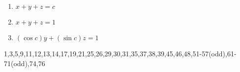 \noindent{\color{smalt(darkpowderblue)}\rule{\linewidth}{.2mm}}
\begin{example} 
\begin{enumerate}
    \item $x+y+z=c$
    \item $x+y+z=1$ 
    \item $(\cos{c})y+(\sin{c})z=1$
\end{enumerate} 
\end{example}
\noindent{\color{smalt(darkpowderblue)}\rule{\linewidth}{.2mm}}
\begin{problem}
1,3,5,9,11,12,13,14,17,19,21,25,26,29,30,31,35,37,38,39,45,46,48,51-57(odd),61-71(odd),74,76
\end{problem}